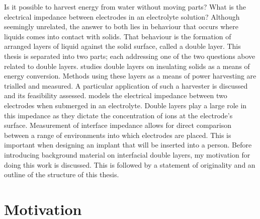 



Is it possible to harvest energy from water without moving parts?
What is the electrical impedance between electrodes in an electrolyte solution?
Although seemingly unrelated, the answer to both lies in behaviour that occurs where liquids comes into contact with solids.
That behaviour is the formation of arranged layers of liquid against the solid surface, called a double layer.
This thesis is separated into two parts; each addressing one of the two questions above related to double layers.
 studies double layers on insulating solids as a means of energy conversion.
Methods using these layers as a means of power harvesting are trialled and measured.
A particular application of such a harvester is discussed and its feasibility assessed.
 models the electrical impedance between two electrodes when submerged in an electrolyte.
Double layers play a large role in this impedance as they dictate the concentration of ions at the electrode's surface.
Measurement of interface impedance allows for direct comparison between a range of environments into which electrodes are placed.
This is important when designing an implant that will be inserted into a person.
Before introducing background material on interfacial double layers, my motivation for doing this work is discussed.
This is followed by a statement of originality and an outline of the structure of this thesis.


\section{Motivation}
  \label{sect:introduction_motiviation}


